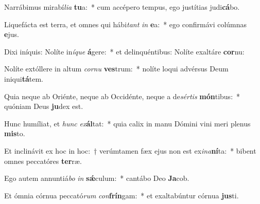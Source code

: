 \item Narrábimus mirabí\textit{li}\textit{a} \textbf{tu}a:~* cum accépero tempus, ego justítias judi\textbf{cá}bo.
\item Liquefácta est terra, et omnes qui hábi\textit{tant} \textit{in} \textbf{e}a:~* ego confirmávi colúmnas \textbf{e}jus.
\item Dixi iníquis: Nolíte in\textit{í}\textit{que} \textbf{á}gere:~* et delinquéntibus: Nolíte exaltáre \textbf{cor}nu:
\item Nolíte extóllere in altum \textit{cor}\textit{nu} \textbf{ves}trum:~* nolíte loqui advérsus Deum iniqui\textbf{tá}tem.
\item Quia neque ab Oriénte, neque ab Occidénte, neque a de\textit{sér}\textit{tis} \textbf{món}tibus:~* quóniam Deus \textbf{ju}dex est.
\item Hunc humíliat, et \textit{hunc} \textit{ex}\textbf{ál}tat:~* quia calix in manu Dómini vini meri plenus \textbf{mis}to.
\item Et inclinávit ex hoc in hoc:~† verúmtamen fæx ejus non est ex\textit{i}\textit{na}\textbf{ní}ta:~* bibent omnes peccatóres \textbf{ter}ræ.
\item Ego autem annuntiá\textit{bo} \textit{in} \textbf{sǽ}culum:~* cantábo Deo \textbf{Ja}cob.
\item Et ómnia córnua peccató\textit{rum} \textit{con}\textbf{frín}gam:~* et exaltabúntur córnua \textbf{jus}ti.
